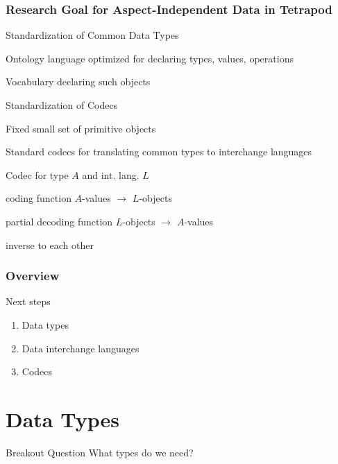 \begin{frame}\frametitle{Research Goal for Aspect-Independent Data in Tetrapod}
\begin{blockitems}{Standardization of Common Data Types}
 \item Ontology language optimized for declaring types, values, operations
 \item Vocabulary declaring such objects
\end{blockitems}

\begin{blockitems}{Standardization of Codecs}
\item Fixed small set of primitive objects
\item Standard codecs for translating common types to interchange languages
\end{blockitems}

\begin{blockitems}{Codec for type $A$ and int. lang. $L$}
\item coding function $A$-values $\to$ $L$-objects
\item partial decoding function $L$-objects $\to$ $A$-values
\item inverse to each other 
\end{blockitems}
\end{frame}

\begin{frame}\frametitle{Overview}
Next steps
\begin{enumerate}
\item Data types
\item Data interchange languages
\item Codecs
\end{enumerate}
\end{frame}

\section{Data Types}

\begin{frame}{Breakout Question}
What types do we need?
\end{frame}

